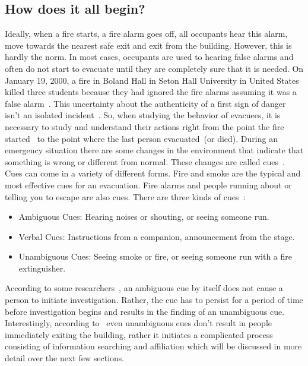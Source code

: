 \subsection{How does it all begin?}
\label{LiteratureReview:HowItAllBegins}
Ideally, when a fire starts, a fire alarm goes off, all occupants hear this alarm, move towards the nearest safe exit and exit from the building. However, this is hardly the norm. In most cases, occupants are used to hearing false alarms and often do not start to evacuate until they are completely sure that it is needed. On January 19, 2000, a fire in Boland Hall in Seton Hall University in United States killed three students because they had ignored the fire alarms assuming it was a false alarm~\cite{Berry:2000us}. This uncertainty about the authenticity of a first sign of danger isn't an isolated incident~\cite{Graham:2000vl,Proulx:2001we,Proulx:1995wq,Proulx:2003tc,Purser:2001ts,Ramachandran:1990wj,Sime:1995uu,Tong:1985wn}. So, when studying the behavior of evacuees, it is necessary to study and understand their actions right from the point the fire started~\cite{Tong:1985wn} to the point where the last person evacuated~(or died).
During an emergency situation there are some changes in the environment that indicate that something is wrong or different from normal. These changes are called cues~\cite{Sime:1983uy}. Cues can come in a variety of different forms. Fire and smoke are the typical and most effective cues for an evacuation. Fire alarms and people running about or telling you to escape are also cues. There are three kinds of cues~\cite{Sime:1983uy}:
\begin{itemize}
\item Ambiguous Cues: Hearing noises or shouting, or seeing someone run.
\item Verbal Cues: Instructions from a companion, announcement from the stage.
\item Unambiguous Cues: Seeing smoke or fire, or seeing someone run with a fire extinguisher.
\end{itemize}
According to some researchers~\cite{Ramachandran:1990wj,Proulx:2007ul}, an ambiguous cue by itself does not cause a person to initiate investigation. Rather, the cue has to persist for a period of time before investigation begins and results in the finding of an unambiguous cue. Interestingly, according to~\cite{Tong:1985wn} even unambiguous cues don't result in people immediately exiting the building, rather it initiates a complicated process consisting of information searching and affiliation which will be discussed in more detail over the next few sections.

